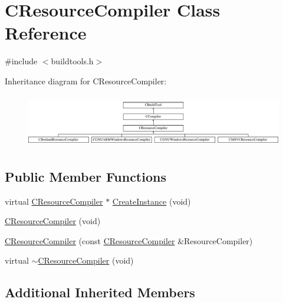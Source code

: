 \hypertarget{classCResourceCompiler}{\section{C\-Resource\-Compiler Class Reference}
\label{classCResourceCompiler}
}


{\ttfamily \#include $<$buildtools.\-h$>$}

Inheritance diagram for C\-Resource\-Compiler\-:\begin{figure}[H]
\begin{center}
\leavevmode
\includegraphics[height=2.362869cm]{da/d57/classCResourceCompiler}
\end{center}
\end{figure}
\subsection*{Public Member Functions}
\begin{DoxyCompactItemize}
\item 
virtual \hyperlink{classCResourceCompiler}{C\-Resource\-Compiler} $\ast$ \hyperlink{classCResourceCompiler_a4f46ae1558a0096b040eb593d28a810c}{Create\-Instance} (void)
\item 
\hyperlink{classCResourceCompiler_aa4f07b32b7092b126833c872f5ec7d42}{C\-Resource\-Compiler} (void)
\item 
\hyperlink{classCResourceCompiler_abf5d0efd06eb512891646839475ba0f8}{C\-Resource\-Compiler} (const \hyperlink{classCResourceCompiler}{C\-Resource\-Compiler} \&Resource\-Compiler)
\item 
virtual \hyperlink{classCResourceCompiler_a0f96c9493d9191a5ab068af045a43f14}{$\sim$\-C\-Resource\-Compiler} (void)
\end{DoxyCompactItemize}
\subsection*{Additional Inherited Members}


